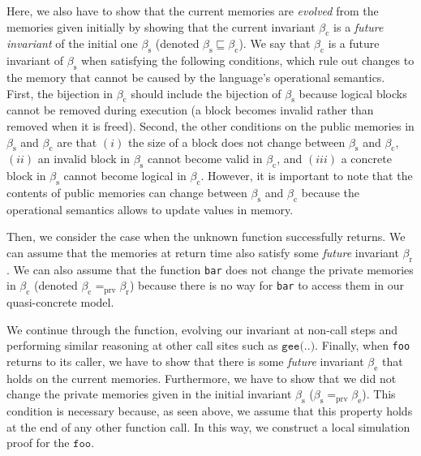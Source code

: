 Here, we also have to show that the current memories are
\emph{evolved} from the memories given initially by showing that the
current invariant $\beta_\textrm{c}$ is a \emph{future invariant} of
the initial one ${\beta_\textrm{s}}$ 
(denoted ${\beta_\textrm{s}}\sqsubseteq\beta_\textrm{c}$).
We say that $\beta_\textrm{c}$ is a future invariant of 
${\beta_\textrm{s}}$ when satisfying the following conditions,
which rule out changes to the memory that cannot be caused 
by the language's operational semantics.  
First, the bijection in
$\beta_\textrm{c}$ should include the bijection of ${\beta_\textrm{s}}$ because
logical blocks cannot be removed during execution (a block
becomes invalid rather than removed when it is freed).  Second, the other
conditions on the public memories in ${\beta_\textrm{s}}$ and
$\beta_\textrm{c}$ are that $(i)$ the size of a block does not change
between ${\beta_\textrm{s}}$ and $\beta_\textrm{c}$, $(ii)$ an
invalid block in ${\beta_\textrm{s}}$ cannot become valid in
$\beta_\textrm{c}$, and $(iii)$ a concrete block in
${\beta_\textrm{s}}$ cannot become logical in $\beta_\textrm{c}$.
However, it is important to note that the contents of public memories
can change between ${\beta_\textrm{s}}$ and $\beta_\textrm{c}$ because
the operational semantics allows
to update values in memory.

Then, we consider the case when the unknown function successfully
returns. We can assume that the memories at return time also satisfy some
\emph{future} invariant ${\beta_\textrm{r}}$. We can also
assume that the function \texttt{bar} does not change the private
memories in $\beta_\textrm{c}$ (denoted $\beta_\textrm{c}
=_{\textrm{prv}} {\beta_\textrm{r}}$) because there is no way
for \texttt{bar} to access them in our quasi-concrete model.

We continue through the function, evolving our invariant at non-call steps and performing similar reasoning at other call sites
such as $\texttt{gee(..)}$.  Finally, when \texttt{foo} returns to its caller, we have to
show that there is some \emph{future} invariant $\beta_\textrm{e}$
that holds on the current memories. Furthermore, we have to show that
we did not change the private memories given in
 the initial invariant $\beta_\textrm{s}$ (\ie $\beta_\textrm{s} =_{\textrm{prv}}
\beta_\textrm{e}$). This condition is necessary because, as seen above, we assume that this property holds at the end of any other function call.
In this way, we construct a local simulation proof for the $\texttt{foo}$.



